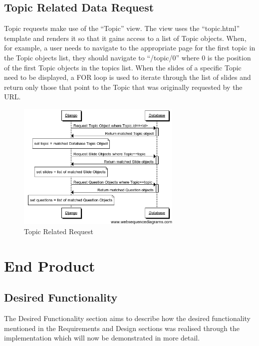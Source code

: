 \documentclass{l3proj}
\begin{document}
\subsection{Topic Related Data Request}
Topic requests make use of the “Topic” view. The view uses the “topic.html” template and renders it so that it gains access to a list of Topic objects. When, for example, a user needs to navigate to the appropriate page for the first topic in the Topic objects list, they should navigate to “/topic/0” where 0 is the position of the first Topic objects in the topics list. When the slides of a specific Topic need to be displayed, a FOR loop is used to iterate through the list of slides and return only those that point to the Topic that was originally requested by the URL.

\begin{figure}[h!]
   \caption{Topic Related Request}
   \centering
     \includegraphics[width=0.7\textwidth]{images/topicRelatedRequest.png}
\end{figure} 

\section{End Product}
\subsection{Desired Functionality}
The Desired Functionality section aims to describe how the desired
functionality mentioned in the Requirements and Design sections was
realised through the implementation which will now be demonstrated in more detail.
\end{document}
